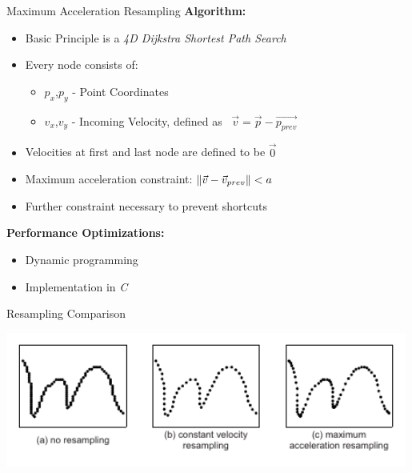 \documentclass[aspectratio=169]{beamer}
\DeclarePairedDelimiter{\norm}{\lVert}{\rVert}
\begin{document}
\begin{frame}{Maximum Acceleration Resampling}
\textbf{Algorithm:}
\begin{itemize}
\item Basic Principle is a \emph{4D Dijkstra Shortest Path Search}
\item Every node consists of:
\begin{itemize}
    \item $p_x$,$p_y$ - Point Coordinates
    \item $v_x$,$v_y$ - Incoming Velocity, defined as~ $\vec{v} = \vec{p} - \vec{p_{prev}}$
\end{itemize}
\item Velocities at first and last node are defined to be $\vec{0}$
\item Maximum acceleration constraint: $\norm{\vec{v} - \vec{v}_{prev}} < a$
\item Further constraint necessary to prevent shortcuts
\end{itemize}

\vspace{1em}
\textbf{Performance Optimizations:}
\begin{itemize}
\item Dynamic programming
\item Implementation in \emph{C}
\end{itemize}
\end{frame}




\begin{frame}{Resampling Comparison}
\begin{center}
\includegraphics[width=0.99\textwidth]{../thesis/assets/sampling/sampling/resampling_comparison.pdf}

\end{center}
\end{frame}
\end{document}
